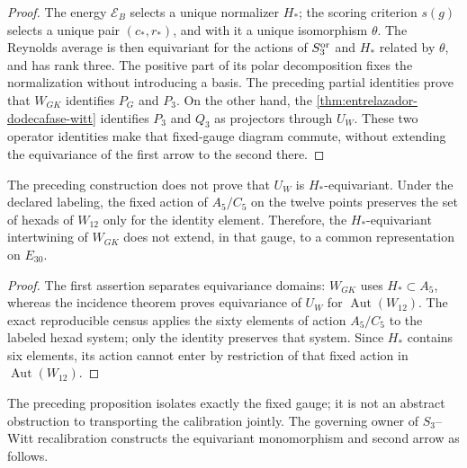 \begin{proof}
The energy \(\mathcal E_B\) selects a unique normalizer \(H_*\);
the scoring criterion \(s(g)\) selects a unique pair \((c_*,r_*)\), and with it a
unique isomorphism \(\theta\). The Reynolds average is then
equivariant for the actions of \(S_3^{\rm or}\) and \(H_*\) related
by \(\theta\), and has rank three. The positive part of its polar
decomposition fixes the normalization without introducing a basis. The preceding
partial identities prove that \(W_{GK}\) identifies
\(P_G\) and \(P_3\). On the other hand, the
\cref{thm:entrelazador-dodecafase-witt} identifies \(P_3\) and \(Q_3\)
as projectors through \(U_W\). These two operator identities make
that fixed-gauge diagram commute, without extending the equivariance of the
first arrow to the second there.
\end{proof}

\begin{proposition}
\label{prop:no-go-equivarianza-hstar-witt}
The preceding construction does not prove that \(U_W\) is
\(H_*\)-equivariant. Under the declared labeling, the fixed action of
\(A_5/C_5\) on the twelve points preserves the set of hexads of
\(W_{12}\) only for the identity element. Therefore, the
\(H_*\)-equivariant intertwining of \(W_{GK}\) does not extend, in that
gauge, to a common representation on \(E_{30}\).
\end{proposition}

\begin{proof}
The first assertion separates equivariance domains:
\(W_{GK}\) uses \(H_*\subset A_5\), whereas the incidence theorem
proves equivariance of \(U_W\) for
\(\operatorname{Aut}(W_{12})\). The exact reproducible census applies the sixty
elements of action \(A_5/C_5\) to the labeled hexad system; only the
identity preserves that system. Since \(H_*\) contains six elements, its
action cannot enter by restriction of that fixed action in
\(\operatorname{Aut}(W_{12})\).
\end{proof}

The preceding proposition isolates exactly the fixed gauge; it is not an
abstract obstruction to transporting the calibration jointly. The
governing owner of \(S_3\)--Witt recalibration constructs the equivariant monomorphism and
second arrow as follows.


